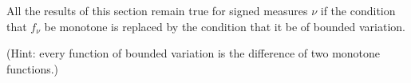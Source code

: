 All the results of this section remain true for signed measures $\nu$ if the condition that $f_\nu$ be monotone is replaced by the condition that it be of bounded variation.

(Hint: every function of bounded variation is the difference of two monotone functions.)
